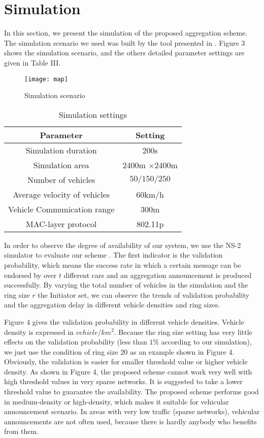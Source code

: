 \documentclass[a4paper]{article}
\begin{document}
\section{Simulation}
In this section, we present the simulation of the proposed aggregation scheme. The simulation scenario we used was built by the tool presented in \cite{KML07}. Figure 3 shows the simulation scenario, and the others detailed parameter settings are given in Table III.

\begin{figure}
  \centering
  \texttt{[image: map]}
  \caption{Simulation scenario}
\end{figure}

\begin{table}
\caption{Simulation settings}
\begin{center}
\begin{tabular}{|c|c|}
  \toprule
Parameter & Setting \\
  \midrule
  Simulation duration & 200s \\
  Simulation area & $2400$m $\times 2400$m\\
  Number of vehicles & $50/150/250$   \\
  Average velocity of vehicles & 60km/h \\
  Vehicle Communication range & 300m \\
  MAC-layer protocol & 802.11p\\
  \bottomrule
\end{tabular}
\end{center}
\end{table}

In order to observe the degree of availability of our system, we use the NS-2 simulator to evaluate our scheme \cite{NS2}. The first indicator is the validation probability, which means the success rate in which a certain message can be endorsed by over $t$ different cars and an aggregation announcement is produced successfully. By varying the total number of vehicles in the simulation and the ring size $r$ the Initiator set, we can observe the trends of validation probability and the aggregation delay in different vehicle densities and ring sizes.

Figure 4 gives the validation probability in different vehicle densities. Vehicle density is expressed in $vehicle/km^2$. Because the ring size setting has very little effects on the validation probability (less than $1\%$ according to our simulation), we just use the condition of ring size 20 as an example shown in Figure 4. Obviously, the validation is easier for smaller threshold value or higher vehicle density.  As shown in Figure 4, the proposed scheme cannot work very well with high threshold values in very sparse networks. It is suggested to take a lower threshold value to guarantee the availability. The proposed scheme performs good in medium-density or high-density, which makes it suitable for vehicular announcement scenario. In areas with very low traffic (sparse networks), vehicular announcements are not often used, because there is hardly anybody who benefits from them.
\end{document}
